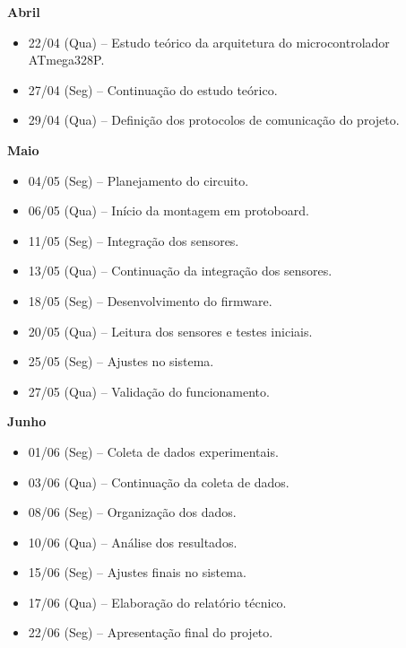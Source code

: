 \documentclass[a4paper,12pt]{article}
\begin{document}
\item \textbf{Abril}
\begin{itemize}
    \item 22/04 (Qua) -- Estudo teórico da arquitetura do microcontrolador ATmega328P.
    \item 27/04 (Seg) -- Continuação do estudo teórico.
    \item 29/04 (Qua) -- Definição dos protocolos de comunicação do projeto.
\end{itemize}

\item \textbf{Maio}
\begin{itemize}
    \item 04/05 (Seg) -- Planejamento do circuito.
    \item 06/05 (Qua) -- Início da montagem em protoboard.
    \item 11/05 (Seg) -- Integração dos sensores.
    \item 13/05 (Qua) -- Continuação da integração dos sensores.
    \item 18/05 (Seg) -- Desenvolvimento do firmware.
    \item 20/05 (Qua) -- Leitura dos sensores e testes iniciais.
    \item 25/05 (Seg) -- Ajustes no sistema.
    \item 27/05 (Qua) -- Validação do funcionamento.
\end{itemize}

\item \textbf{Junho}
\begin{itemize}
    \item 01/06 (Seg) -- Coleta de dados experimentais.
    \item 03/06 (Qua) -- Continuação da coleta de dados.
    \item 08/06 (Seg) -- Organização dos dados.
    \item 10/06 (Qua) -- Análise dos resultados.
    \item 15/06 (Seg) -- Ajustes finais no sistema.
    \item 17/06 (Qua) -- Elaboração do relatório técnico.
    \item 22/06 (Seg) -- Apresentação final do projeto.
\end{itemize}
\end{document}
